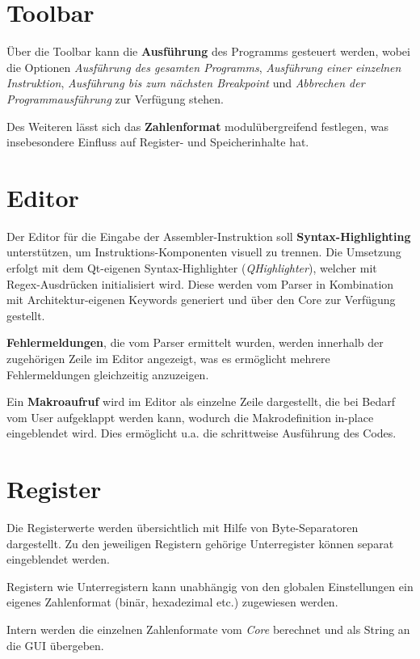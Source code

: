 \section{Toolbar}

Über die Toolbar kann die \textbf{Ausführung} des Programms gesteuert werden,
wobei die Optionen \textit{Ausführung des gesamten Programms},
\textit{Ausführung einer einzelnen Instruktion}, \textit{Ausführung bis zum
  nächsten Breakpoint} und \textit{Abbrechen der Programmausführung} zur
Verfügung stehen.

Des Weiteren lässt sich das \textbf{Zahlenformat} modulübergreifend festlegen,
was insebesondere Einfluss auf Register- und Speicherinhalte hat.

\section{Editor}

Der Editor für die Eingabe der Assembler-Instruktion soll
\textbf{Syntax-Highlighting} unterstützen, um Instruktions-Komponenten visuell
zu trennen. Die Umsetzung erfolgt mit dem Qt-eigenen Syntax-Highlighter
(\textit{QHighlighter}), welcher mit Regex-Ausdrücken initialisiert wird. Diese
werden vom Parser in Kombination mit Architektur-eigenen Keywords generiert und
über den Core zur Verfügung gestellt.

\textbf{Fehlermeldungen}, die vom Parser ermittelt wurden, werden innerhalb der
zugehörigen Zeile im Editor angezeigt, was es ermöglicht mehrere Fehlermeldungen
gleichzeitig anzuzeigen.

Ein \textbf{Makroaufruf} wird im Editor als einzelne Zeile dargestellt, die bei
Bedarf vom User aufgeklappt werden kann, wodurch die Makrodefinition in-place
eingeblendet wird. Dies ermöglicht u.a. die schrittweise Ausführung des Codes.

\section{Register}

Die Registerwerte werden übersichtlich mit Hilfe von Byte-Separatoren
dargestellt. Zu den jeweiligen Registern gehörige Unterregister können separat
eingeblendet werden.

Registern wie Unterregistern kann unabhängig von den globalen Einstellungen ein
eigenes Zahlenformat (binär, hexadezimal etc.) zugewiesen werden.

Intern werden die einzelnen Zahlenformate vom \textit{Core} berechnet und als
String an die GUI übergeben.

